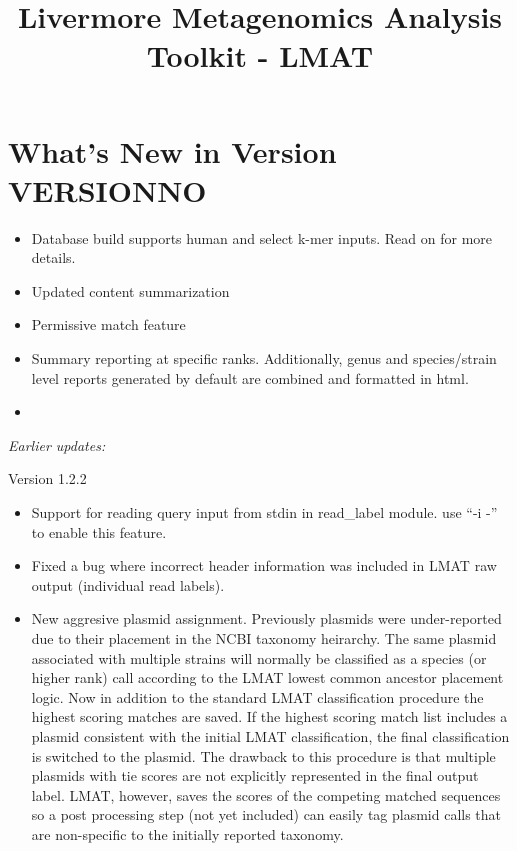 \documentclass[11pt]{article}
\title{Livermore Metagenomics Analysis Toolkit - LMAT}
\newcommand{\lmatver}{VERSIONNO}
\begin{document}
\maketitle
\tableofcontents

\section{What's New in Version \lmatver}
\begin{itemize}
\item 
Database build supports human and select k-mer inputs.  Read on for more details.
\item 
Updated content summarization
\item
Permissive match feature
\item
Summary reporting at specific ranks.  Additionally, genus and species/strain level reports generated by default are combined and formatted in html.
\item



\end{itemize}

{\it Earlier updates:}

Version 1.2.2
\begin{itemize} 
\item
Support for reading query input from stdin in read\_label module.  use ``-i -'' to enable this feature.
\item
Fixed a bug where incorrect header information was included in LMAT raw output (individual read labels).
\item New aggresive plasmid assignment.  Previously plasmids were under-reported due to their placement in the NCBI taxonomy heirarchy. The same plasmid associated with multiple strains will normally be classified as a species (or higher rank) call according to the LMAT lowest common ancestor placement logic. Now in addition to the standard LMAT classification procedure the highest scoring matches are saved.  If the highest scoring match list includes a plasmid consistent with the initial LMAT classification, the final classification is switched to the plasmid.  The drawback
to this procedure is that multiple plasmids with tie scores are not explicitly represented in the final output label. LMAT, however, saves the scores of the competing matched sequences so a post processing step (not yet included) can easily tag plasmid calls that are non-specific to the initially reported taxonomy. \end{itemize}
\end{document}
